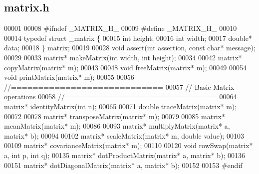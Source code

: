 \subsection{matrix.\+h}
\label{matrix_8h_source}

\begin{DoxyCode}
00001 
00008 \textcolor{preprocessor}{#ifndef \_MATRIX\_H\_}
00009 \textcolor{preprocessor}{#define \_MATRIX\_H\_}
00010 
00014 \textcolor{keyword}{typedef} \textcolor{keyword}{struct }_matrix \{
00015     \textcolor{keywordtype}{int} height;
00016     \textcolor{keywordtype}{int} width;
00017     \textcolor{keywordtype}{double}* data;
00018 \} matrix;
00019 
00028 \textcolor{keywordtype}{void} assert(\textcolor{keywordtype}{int} assertion, \textcolor{keyword}{const} \textcolor{keywordtype}{char}* message);
00029 
00033 matrix* makeMatrix(\textcolor{keywordtype}{int} width, \textcolor{keywordtype}{int} height);
00034 
00042 matrix* copyMatrix(matrix* m);
00043 
00048 \textcolor{keywordtype}{void} freeMatrix(matrix* m);
00049 
00054 \textcolor{keywordtype}{void} printMatrix(matrix* m);
00055 
00056 \textcolor{comment}{//============================}
00057 \textcolor{comment}{// Basic Matrix operations}
00058 \textcolor{comment}{//============================}
00064 \textcolor{comment}{}matrix* identityMatrix(\textcolor{keywordtype}{int} n);
00065 
00071 \textcolor{keywordtype}{double} traceMatrix(matrix* m);
00072 
00078 matrix* transposeMatrix(matrix* m);
00079 
00085 matrix* meanMatrix(matrix* m);
00086 
00093 matrix* multiplyMatrix(matrix* a, matrix* b);
00094 
00102 matrix* scaleMatrix(matrix* m, \textcolor{keywordtype}{double} value);
00103 
00109 matrix* covarianceMatrix(matrix* m);
00110 
00120 \textcolor{keywordtype}{void} rowSwap(matrix* a, \textcolor{keywordtype}{int} p, \textcolor{keywordtype}{int} q);
00135 matrix* dotProductMatrix(matrix* a, matrix* b);
00136 
00151 matrix* dotDiagonalMatrix(matrix* a, matrix* b);
00152 
00153 \textcolor{preprocessor}{#endif}
\end{DoxyCode}
